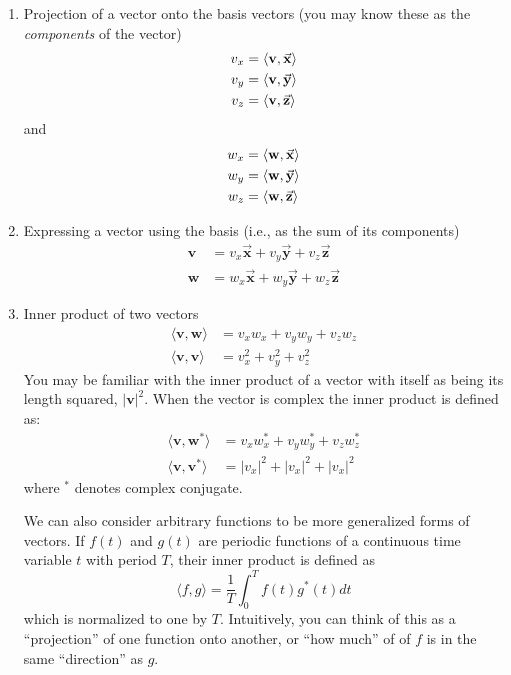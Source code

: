 \begin{enumerate}
\item Projection of a vector onto the basis vectors (you may
know these as the \emph{components} of the vector)
\begin{align}
v_x &= \langle\mathbf{v},\vec{\mathbf{x}}\rangle \notag\\
v_y &= \langle\mathbf{v},\vec{\mathbf{y}}\rangle \label{eq:basis-proj}\\
v_z &= \langle\mathbf{v},\vec{\mathbf{z}}\rangle \notag\\ 
\end{align}
and 
\begin{align}
w_x &= \langle\mathbf{w},\vec{\mathbf{x}}\rangle \notag\\
w_y &= \langle\mathbf{w},\vec{\mathbf{y}}\rangle \\
w_z &= \langle\mathbf{w},\vec{\mathbf{z}}\rangle \notag\\ 
\end{align}
\item Expressing a vector using the basis (i.e., as the sum of its
components)
\begin{align}
\mathbf{v} &= v_x\vec{\mathbf{x}} + v_y\vec{\mathbf{y}} +
v_z\vec{\mathbf{z}} \label{eq:vec-comps}\\ 
\mathbf{w} &= w_x\vec{\mathbf{x}} + w_y\vec{\mathbf{y}} +
w_z\vec{\mathbf{z}}
\end{align}
\item Inner product of two vectors
\begin{align}
\langle\mathbf{v}, \mathbf{w}\rangle &= v_xw_x +  v_yw_y + v_zw_z
 \label{eq:inner-product}\\
\langle\mathbf{v}, \mathbf{v}\rangle &= v_x^2 +  v_y^2 + v_z^2
\end{align}
You may be familiar with the inner product of a vector with itself as
being its length squared, $|\mathbf{v}|^2$.  When the vector is
complex the inner product is defined as:
\begin{align}
\langle\mathbf{v}, \mathbf{w^*}\rangle &= v_xw_x^* +  v_yw_y^* + v_zw_z^*
 \label{eq:complex-ip}\\
\langle\mathbf{v}, \mathbf{v^*}\rangle &= |v_x|^2 + |v_x|^2 + |v_x|^2
\end{align}
where $^*$ denotes complex conjugate. 

We can also consider arbitrary functions to be more generalized forms
of vectors. If $f(t)$ and $g(t)$ are periodic functions of a
continuous time variable $t$ with period $T$, their inner product is
defined as
\begin{equation}
\langle f, g\rangle = \frac{1}{T}\int_0^T f(t)g^*(t) dt \label{eq:func-ip}
\end{equation}
which is normalized to one by $T$. Intuitively, you can think of this as a ``projection'' of one function onto another, or ``how much'' of of $f$ is in the same ``direction'' as $g$.


\end{enumerate}
